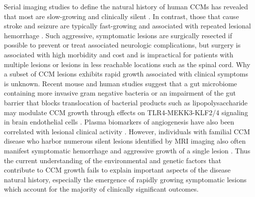 Serial imaging studies to define the natural history of human CCMs has revealed that most are slow-growing and clinically silent \citep{akers2017, alshanisalman2012, horne2016}. In contrast, those that cause stroke and seizure are typically fast-growing and associated with repeated lesional hemorrhage \citep{awad2019, porter1997}. Such aggressive, symptomatic lesions are surgically resected if possible to prevent or treat associated neurologic complications, but surgery is associated with high morbidity and cost and is impractical for patients with multiple lesions or lesions in less reachable locations such as the spinal cord. Why a subset of CCM lesions exhibits rapid growth associated with clinical symptoms is unknown. Recent mouse and human studies suggest that a gut microbiome containing more invasive gram negative bacteria or an impairment of the gut barrier that blocks translocation of bacterial products such as lipopolysaccharide may modulate CCM growth through effects on TLR4-MEKK3-KLF2/4 signaling in brain endothelial cells \citep{tang2019, tang2017, polster2020}. Plasma biomarkers of angiogenesis have also been correlated with lesional clinical activity \citep{girard2018, lyne2019}. However, individuals with familial CCM disease who harbor numerous silent lesions identified by MRI imaging also often manifest symptomatic hemorrhage and aggressive growth of a single lesion \citep{polster2019}. Thus the current understanding of the environmental and genetic factors that contribute to CCM growth fails to explain important aspects of the disease natural history, especially the emergence of rapidly growing symptomatic lesions which account for the majority of clinically significant outcomes.

